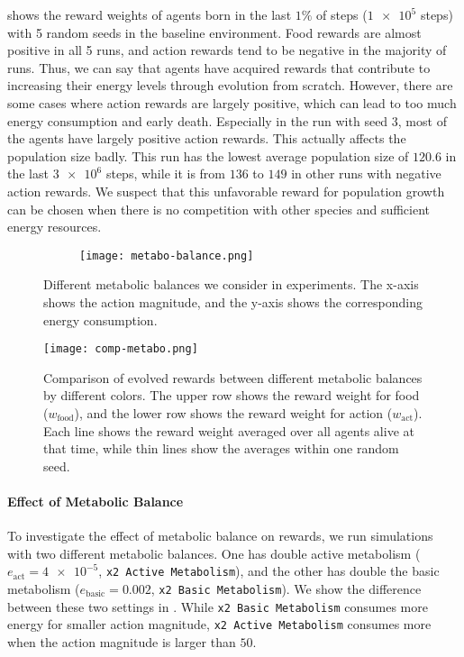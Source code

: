  shows the reward weights of agents born in the last $1\%$ of steps ($\num{1e5}$ steps) with 5 random seeds in the baseline environment. Food rewards are almost positive in all 5 runs, and action rewards tend to be negative in the majority of runs. Thus, we can say that agents have acquired rewards that contribute to increasing their energy levels through evolution from scratch. However, there are some cases where action rewards are largely positive, which can lead to too much energy consumption and early death. Especially in the run with seed $3$, most of the agents have largely positive action rewards. This actually affects the population size badly. This run has the lowest average population size of $120.6$ in the last $\num{3e6}$ steps, while it is from $136$ to $149$ in other runs with negative action rewards. We suspect that this unfavorable reward for population growth can be chosen when there is no competition with other species and sufficient energy resources.

\begin{figure}[t]
  \begin{subfigure}[t]{8cm}
    \centering
    \texttt{[image: metabo-balance.png]}
  \end{subfigure}
  \caption{
    Different metabolic balances we consider in experiments. The x-axis shows the action magnitude, and the y-axis shows the corresponding energy consumption.
  }\label{figure:metabo-balance}
\end{figure}

\begin{figure}[t]
  \centering
  \texttt{[image: comp-metabo.png]}
  \caption{
    Comparison of evolved rewards between different metabolic balances by different colors.
    The upper row shows the reward weight for food ($w_{\mathrm{food}}$), and the lower row shows the reward weight for action ($w_{\mathrm{act}}$).
    Each line shows the reward weight averaged over all agents alive at that time, while thin lines show the averages within one random seed.
  }\label{figure:result-metabolism}
\end{figure}

\paragraph{Effect of Metabolic Balance}
To investigate the effect of metabolic balance on rewards, we run simulations with two different metabolic balances. One has double active metabolism ($e_{\mathrm{act}} = \num{4e-5}$, \texttt{x2 Active Metabolism}), and the other has double the basic metabolism ($e_{\mathrm{basic}} = 0.002$, \texttt{x2 Basic Metabolism}). We show the difference between these two settings in . While \texttt{x2 Basic Metabolism} consumes more energy for smaller action magnitude, \texttt{x2 Active Metabolism} consumes more when the action magnitude is larger than $50$.


